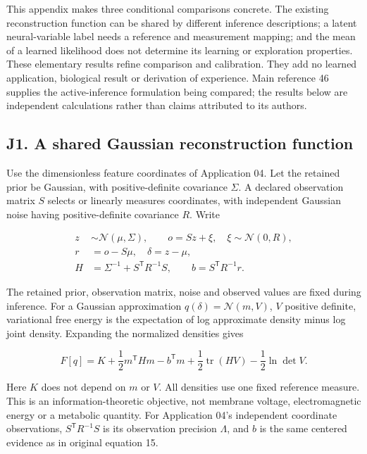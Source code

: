 \documentclass[
  american,
  11pt,
  letterpaper,
]{article}
\begin{document}
This appendix makes three conditional comparisons concrete. The existing reconstruction function can be shared by different inference descriptions; a latent neural-variable label needs a reference and measurement mapping; and the mean of a learned likelihood does not determine its learning or exploration properties. These elementary results refine comparison and calibration. They add no learned application, biological result or derivation of experience. Main reference 46 supplies the active-inference formulation being compared; the results below are independent calculations rather than claims attributed to its authors.

\subsection{J1. A shared Gaussian reconstruction function}\label{j1.-a-shared-gaussian-reconstruction-function}

Use the dimensionless feature coordinates of Application 04. Let the retained prior be Gaussian, with positive-definite covariance \(\Sigma\). A declared observation matrix \(S\) selects or linearly measures coordinates, with independent Gaussian noise having positive-definite covariance \(R\). Write

\begin{equation}
\begin{aligned}
z&\sim\mathcal N(\mu,\Sigma),\qquad o=Sz+\xi,\quad\xi\sim\mathcal N(0,R),\\
r&=o-S\mu,\quad\delta=z-\mu,\\
H&=\Sigma^{-1}+S^{\mathsf T}R^{-1}S,\qquad
b=S^{\mathsf T}R^{-1}r.
\end{aligned}\tag{J1}
\end{equation}

The retained prior, observation matrix, noise and observed values are fixed during inference. For a Gaussian approximation \(q(\delta)=\mathcal N(m,V)\), \(V\) positive definite, variational free energy is the expectation of log approximate density minus log joint density. Expanding the normalized densities gives

\begin{equation}
F[q]=K+\frac12m^{\mathsf T}Hm-b^{\mathsf T}m
       +\frac12\operatorname{tr}(HV)-\frac12\ln\det V.
\tag{J2}
\end{equation}

Here \(K\) does not depend on \(m\) or \(V\). All densities use one fixed reference measure. This is an information-theoretic objective, not membrane voltage, electromagnetic energy or a metabolic quantity. For Application 04's independent coordinate observations, \(S^{\mathsf T}R^{-1}S\) is its observation precision \(\Lambda\), and \(b\) is the same centered evidence as in original equation 15.
\end{document}
